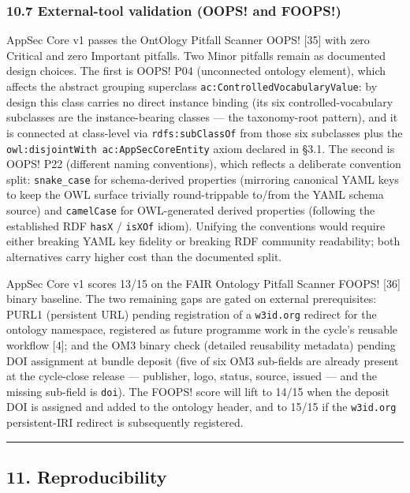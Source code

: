 \documentclass[
]{article}
\begin{document}
\subsubsection{10.7 External-tool validation (OOPS! and
FOOPS!)}\label{external-tool-validation-oops-and-foops}

AppSec Core v1 passes the OntOlogy Pitfall Scanner OOPS! {[}35{]} with
zero Critical and zero Important pitfalls. Two Minor pitfalls remain as
documented design choices. The first is OOPS! P04 (unconnected ontology
element), which affects the abstract grouping superclass
\texttt{ac:ControlledVocabularyValue}: by design this class carries no
direct instance binding (its six controlled-vocabulary subclasses are
the instance-bearing classes --- the taxonomy-root pattern), and it is
connected at class-level via \texttt{rdfs:subClassOf} from those six
subclasses plus the \texttt{owl:disjointWith\ ac:AppSecCoreEntity} axiom
declared in §3.1. The second is OOPS! P22 (different naming
conventions), which reflects a deliberate convention split:
\texttt{snake\_case} for schema-derived properties (mirroring canonical
YAML keys to keep the OWL surface trivially round-trippable to/from the
YAML schema source) and \texttt{camelCase} for OWL-generated derived
properties (following the established RDF \texttt{hasX} / \texttt{isXOf}
idiom). Unifying the conventions would require either breaking YAML key
fidelity or breaking RDF community readability; both alternatives carry
higher cost than the documented split.

AppSec Core v1 scores 13/15 on the FAIR Ontology Pitfall Scanner FOOPS!
{[}36{]} binary baseline. The two remaining gaps are gated on external
prerequisites: PURL1 (persistent URL) pending registration of a
\texttt{w3id.org} redirect for the ontology namespace, registered as
future programme work in the cycle's reusable workflow {[}4{]}; and the
OM3 binary check (detailed reusability metadata) pending DOI assignment
at bundle deposit (five of six OM3 sub-fields are already present at the
cycle-close release --- publisher, logo, status, source, issued --- and
the missing sub-field is \texttt{doi}). The FOOPS! score will lift to
14/15 when the deposit DOI is assigned and added to the ontology header,
and to 15/15 if the \texttt{w3id.org} persistent-IRI redirect is
subsequently registered.

\begin{center}\rule{0.5\linewidth}{0.5pt}\end{center}

\subsection{11. Reproducibility}\label{reproducibility}
\end{document}

